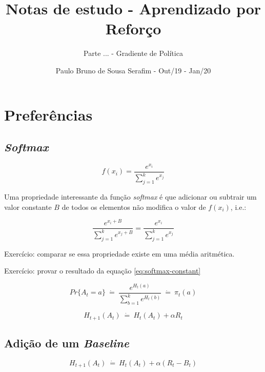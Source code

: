 \documentclass{article}
\title{Notas de estudo - Aprendizado por Reforço}
\author{Parte ...  - Gradiente de Política}
\date{Paulo Bruno de Sousa Serafim - Out/19 - Jan/20}
\begin{document}
\maketitle

\section{Preferências}

    \subsection{\emph{Softmax}}
        
        \begin{equation}
            f(x_i) = \frac{e^{x_i}}{\sum_{j=1}^{k}e^{x_j}}
        \end{equation}
    
        Uma propriedade interessante da função \emph{softmax} é que adicionar ou subtrair um valor constante $B$ de todos os elementos não modifica o valor de $f(x_i)$, i.e.:
        
        \begin{equation}
        \label{eq:softmax-constant}
            \frac{e^{x_i + B}}{\sum_{j=1}^{k}e^{x_j + B}} = \frac{e^{x_i}}{\sum_{j=1}^{k}e^{x_j}}
        \end{equation}
    
        Exercício: comparar se essa propriedade existe em uma média aritmética.
        
        Exercício: provar o resultado da equação \eqref{eq:softmax-constant}

        \begin{equation}
            Pr\{A_t=a\} \ \dot{=} \  \frac{e^{H_t(a)}}{\sum_{b=1}^{k}e^{H_t(b)}} \ \dot{=} \ \pi_t(a)
        \end{equation}
    
        \begin{equation}
            H_{t+1}(A_t) \ \dot{=} \ H_t(A_t) + \alpha R_t
        \end{equation}

    \subsection{Adição de um \emph{Baseline}}
    
        \begin{equation}
            H_{t+1}(A_t) \ \dot{=} \ H_t(A_t) + \alpha (R_t - B_t)
        \end{equation}
    
\end{document}
